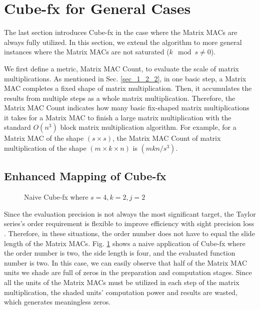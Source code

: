 \section{Cube-fx for General Cases \label{sec:4}}

The last section introduces Cube-fx in the case where the Matrix MACs are always fully utilized. In this section, we extend the algorithm to more general instances where the Matrix MACs are not saturated ($k \mod s \neq 0$).

We first define a metric, Matrix MAC Count, to evaluate the scale of matrix multiplications. As mentioned in Sec. \ref{sec_1_2_2}, in one basic step, a Matrix MAC completes a fixed shape of matrix multiplication. Then, it accumulates the results from multiple steps as a whole matrix multiplication. Therefore, the Matrix MAC Count indicates how many basic fix-shaped matrix multiplications it takes for a Matrix MAC to finish a large matrix multiplication with the standard $O(n^3)$ block matrix multiplication algorithm. For example, for a Matrix MAC of the shape $(s \times s)$, the Matrix MAC Count of matrix multiplication of the shape $(m \times k \times n)$ is $(mkn / s^3)$. 

\subsection{Enhanced Mapping of Cube-fx}

\begin{figure}[t]
    \caption{Naive Cube-fx where $s = 4, k = 2, j = 2$}
    \label{fig:problem}
    \end{figure}

Since the evaluation precision is not always the most significant target, the Taylor series's order requirement is flexible to improve efficiency with sight precision loss \cite{math}. Therefore, in these situations, the order number does not have to equal the slide length of the Matrix MACs. Fig. \ref{fig:problem} shows a naive application of Cube-fx where the order number is two, the side length is four, and the evaluated function number is two. In this case, we can easily observe that half of the Matrix MAC units we shade are full of zeros in the preparation and computation stages. Since all the units of the Matrix MACs must be utilized in each step of the matrix multiplication, the shaded units' computation power and results are wasted, which generates meaningless zeros.


